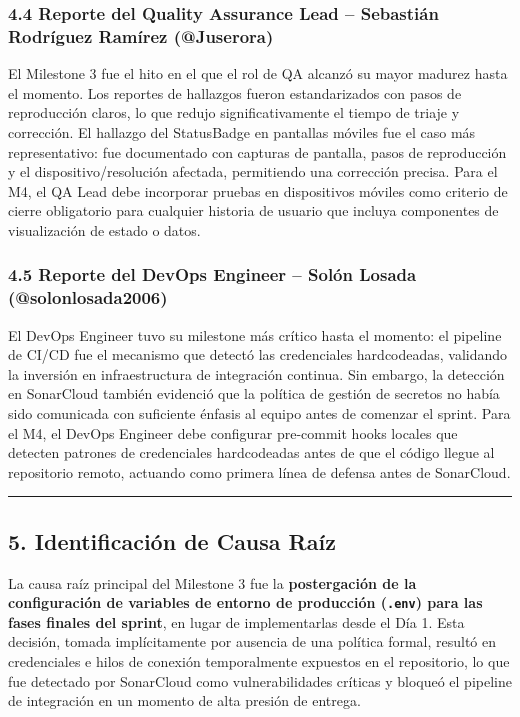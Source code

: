 \documentclass[11pt,a4paper]{article}
\begin{document}
\subsubsection{4.4 Reporte del Quality Assurance Lead -- Sebastián Rodríguez Ramírez (@Juserora)}

El Milestone 3 fue el hito en el que el rol de QA alcanzó su mayor madurez hasta el momento. Los reportes de hallazgos fueron estandarizados con pasos de reproducción claros, lo que redujo significativamente el tiempo de triaje y corrección. El hallazgo del StatusBadge en pantallas móviles fue el caso más representativo: fue documentado con capturas de pantalla, pasos de reproducción y el dispositivo/resolución afectada, permitiendo una corrección precisa. Para el M4, el QA Lead debe incorporar pruebas en dispositivos móviles como criterio de cierre obligatorio para cualquier historia de usuario que incluya componentes de visualización de estado o datos.

\subsubsection{4.5 Reporte del DevOps Engineer -- Solón Losada (@solonlosada2006)}

El DevOps Engineer tuvo su milestone más crítico hasta el momento: el pipeline de CI/CD fue el mecanismo que detectó las credenciales hardcodeadas, validando la inversión en infraestructura de integración continua. Sin embargo, la detección en SonarCloud también evidenció que la política de gestión de secretos no había sido comunicada con suficiente énfasis al equipo antes de comenzar el sprint. Para el M4, el DevOps Engineer debe configurar pre-commit hooks locales que detecten patrones de credenciales hardcodeadas antes de que el código llegue al repositorio remoto, actuando como primera línea de defensa antes de SonarCloud.

\vspace{0.6em}\hrule\vspace{0.8em}

\subsection{5. Identificación de Causa Raíz}

La causa raíz principal del Milestone 3 fue la \textbf{postergación de la configuración de variables de entorno de producción (\texttt{.env}) para las fases finales del sprint}, en lugar de implementarlas desde el Día 1. Esta decisión, tomada implícitamente por ausencia de una política formal, resultó en credenciales e hilos de conexión temporalmente expuestos en el repositorio, lo que fue detectado por SonarCloud como vulnerabilidades críticas y bloqueó el pipeline de integración en un momento de alta presión de entrega.
\end{document}
